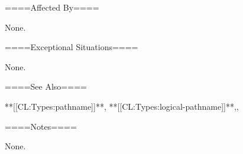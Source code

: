 ====Affected By====

None.

====Exceptional Situations====

None.

====See Also====

**[[CL:Types:pathname]]**, **[[CL:Types:logical-pathname]]**,{\secref\FileSystemConcepts},

{\secref\PathnamesAsFilenames}

====Notes====

None.

    
